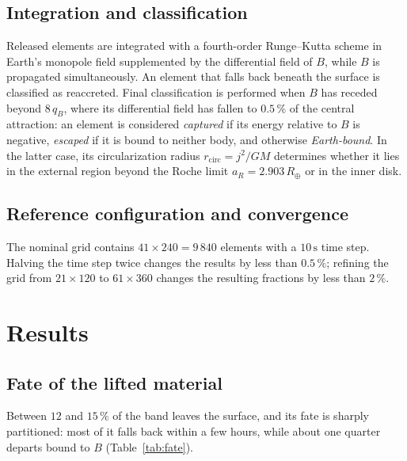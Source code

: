\documentclass[11pt,a4paper]{article}
\begin{document}
\subsection{Integration and classification}
Released elements are integrated with a fourth-order Runge--Kutta scheme in Earth's monopole field supplemented by the differential field of $B$, while $B$ is propagated simultaneously. An element that falls back beneath the surface is classified as reaccreted. Final classification is performed when $B$ has receded beyond $8\,q_B$, where its differential field has fallen to $0.5\,\%$ of the central attraction: an element is considered \emph{captured} if its energy relative to $B$ is negative, \emph{escaped} if it is bound to neither body, and otherwise \emph{Earth-bound}. In the latter case, its circularization radius $r_{\mathrm{circ}}=j^2/GM$ determines whether it lies in the external region beyond the Roche limit $a_R=2.903\,R_\oplus$ or in the inner disk.

\subsection{Reference configuration and convergence}
\noindent{}
\vspace{0.5em}

The nominal grid contains $41\times240=9\,840$ elements with a $10\,\mathrm{s}$ time step. Halving the time step twice changes the results by less than $0.5\,\%$; refining the grid from $21\times120$ to $61\times360$ changes the resulting fractions by less than $2\,\%$.

\section{Results}

\subsection{Fate of the lifted material}
Between $12$ and $15\,\%$ of the band leaves the surface, and its fate is sharply partitioned: most of it falls back within a few hours, while about one quarter departs bound to $B$ (Table~\ref{tab:fate}).
\end{document}
